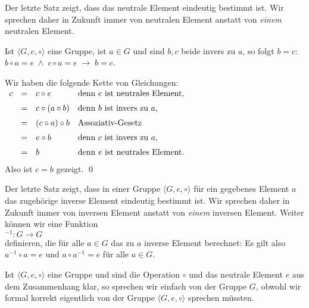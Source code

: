 \remark
Der letzte Satz zeigt, dass das neutrale Element eindeutig bestimmt ist.  Wir sprechen daher in Zukunft
immer von \underline{} neutralen Element anstatt von \emph{einem} neutralen Element.
\eox

\begin{Satz} \lb
  Ist $\langle G, e, \circ \rangle$ eine Gruppe, ist $a \in G$ und sind $b,c$ beide invers zu $a$, so folgt
  $b = c$:
  \\[0.2cm]
  \hspace*{1.3cm}
  $b \circ a = e \;\wedge\; c \circ a = e \;\rightarrow\; b = c$.
\end{Satz}

\proof
Wir haben die folgende Kette von Gleichungen:
\\[0.2cm]
\hspace*{1.3cm}
$
\begin{array}[t]{lcll}
  c & = & c \circ e & \mbox{denn $e$ ist neutrales Element,} \\[0.2cm]
    & = & c \circ (a \circ b) & \mbox{denn $b$ ist invers zu $a$,} \\[0.2cm]
    & = & (c \circ a) \circ b & \mbox{Assoziativ-Gesetz} \\[0.2cm]
    & = & e \circ b & \mbox{denn $c$ ist invers zu $a$,} \\[0.2cm]
    & = & b & \mbox{denn $e$ ist neutrales Element.} \\[0.2cm]
\end{array}
$
\\[0.2cm]
Also ist $c = b$ gezeigt. \qed


\remark Der letzte Satz zeigt, dass in einer Gruppe $\langle G, e, \circ \rangle$ f\"{u}r ein
gegebenes Element $a$ das zugeh\"{o}rige inverse Element eindeutig bestimmt ist. 
Wir sprechen daher in Zukunft
immer von \underline{} inversen Element anstatt von \emph{einem} inversen Element.
Weiter k\"{o}nnen wir eine Funktion
\\[0.2cm]
\hspace*{1.3cm} $^{-1}: G \rightarrow G$
\\[0.2cm]
definieren, die f\"{u}r alle $a \in G$ das zu $a$ inverse Element berechnet: Es gilt also
\\[0.2cm]
\hspace*{1.3cm} $a^{-1} \circ a = e$ \quad und \quad $a \circ a^{-1} = e$ \quad f\"{u}r alle $a \in G$.
\eox

\remark
Ist $\langle G, e, \circ \rangle$ eine Gruppe und sind die Operation $\circ$ und das neutrale Element 
$e$ aus dem Zusammenhang klar, so sprechen wir einfach von der Gruppe $G$, obwohl wir formal korrekt
eigentlich von der Gruppe $\langle G, e, \circ \rangle$ sprechen m\"{u}ssten. 
\eox

